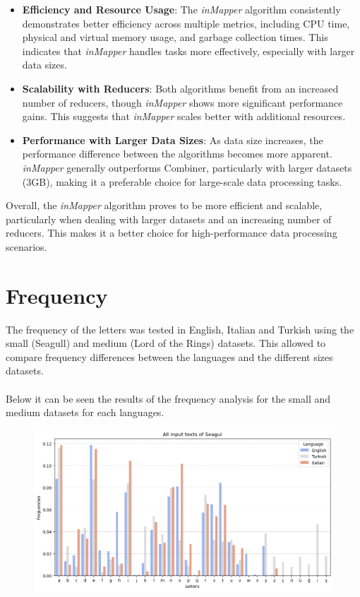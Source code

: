 \begin{itemize}
    \item \textbf{Efficiency and Resource Usage}: The \textit{inMapper} algorithm consistently demonstrates better efficiency across multiple metrics, including CPU time, physical and virtual memory usage, and garbage collection times. This indicates that \textit{inMapper} handles tasks more effectively, especially with larger data sizes.
    \item \textbf{Scalability with Reducers}: Both algorithms benefit from an increased number of reducers, though \textit{inMapper} shows more significant performance gains. This suggests that \textit{inMapper} scales better with additional resources.
    \item \textbf{Performance with Larger Data Sizes}: As data size increases, the performance difference between the algorithms becomes more apparent. \textit{inMapper} generally outperforms Combiner, particularly with larger datasets (3GB), making it a preferable choice for large-scale data processing tasks.
\end{itemize}

Overall, the \textit{inMapper} algorithm proves to be more efficient and scalable, particularly when dealing with larger datasets and an increasing number of reducers. This makes it a better choice for high-performance data processing scenarios.


\newpage

\section{Frequency}
The frequency of the letters was tested in English, Italian and Turkish using the small (Seagull) and medium (Lord of the Rings) datasets. 
This allowed to compare frequency differences between the languages and the different sizes datasets.\\ \\
Below it can be seen the results of the frequency analysis for the small and medium datasets for each languages.

\begin{figure}[h]
    \centering
    \includegraphics[width=1\textwidth]{media/allSeagul.png}
\end{figure}

